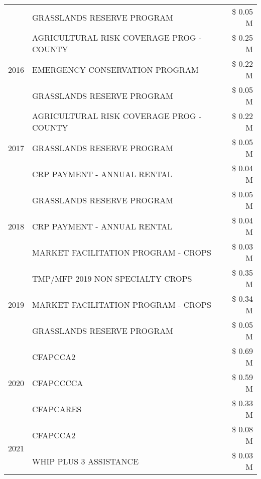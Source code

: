 \begin{tabular}{llr}
 & GRASSLANDS RESERVE PROGRAM & \$ 0.05 M \\
\cline{1-3}
\multirow[t]{3}{*}{2016} & AGRICULTURAL RISK COVERAGE PROG - COUNTY & \$ 0.25 M \\
 & EMERGENCY CONSERVATION PROGRAM & \$ 0.22 M \\
 & GRASSLANDS RESERVE PROGRAM & \$ 0.05 M \\
\cline{1-3}
\multirow[t]{3}{*}{2017} & AGRICULTURAL RISK COVERAGE PROG - COUNTY & \$ 0.22 M \\
 & GRASSLANDS RESERVE PROGRAM & \$ 0.05 M \\
 & CRP PAYMENT - ANNUAL RENTAL & \$ 0.04 M \\
\cline{1-3}
\multirow[t]{3}{*}{2018} & GRASSLANDS RESERVE PROGRAM & \$ 0.05 M \\
 & CRP PAYMENT - ANNUAL RENTAL & \$ 0.04 M \\
 & MARKET FACILITATION PROGRAM - CROPS & \$ 0.03 M \\
\cline{1-3}
\multirow[t]{3}{*}{2019} & TMP/MFP 2019 NON SPECIALTY CROPS & \$ 0.35 M \\
 & MARKET FACILITATION PROGRAM - CROPS & \$ 0.34 M \\
 & GRASSLANDS RESERVE PROGRAM & \$ 0.05 M \\
\cline{1-3}
\multirow[t]{3}{*}{2020} & CFAPCCA2 & \$ 0.69 M \\
 & CFAPCCCCA & \$ 0.59 M \\
 & CFAPCARES & \$ 0.33 M \\
\cline{1-3}
\multirow[t]{2}{*}{2021} & CFAPCCA2 & \$ 0.08 M \\
 & WHIP PLUS 3 ASSISTANCE & \$ 0.03 M \\
\cline{1-3}
\bottomrule
\end{tabular}
